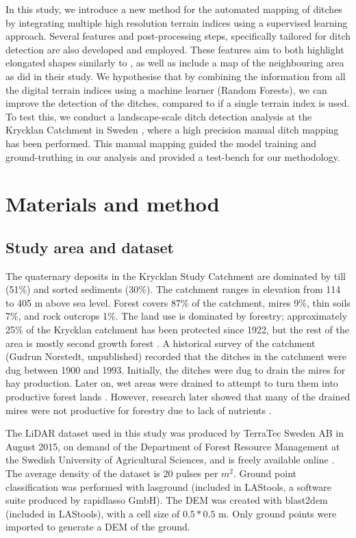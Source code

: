 \documentclass[11pt, review]{elsarticle} %
\begin{document}
In this study, we introduce a new method for the automated mapping of ditches by integrating multiple high resolution terrain indices using a supervised learning approach. Several features and post-processing steps, specifically tailored for ditch detection are also developed and employed. These features aim to both highlight elongated shapes similarly to \citet{cazorzi}, as well as include a map of the neighbouring area as \citet{roelens} did in their study. We hypothesise that by combining the information from all the digital terrain indices using a machine learner (Random Forests), we can improve the detection of the ditches, compared to if a single terrain index is used. To test this, we conduct a landscape-scale ditch detection analysis at the Krycklan Catchment in Sweden \citep{krycklancatchment}, where a high precision manual ditch mapping has been performed. This manual mapping guided the model training and ground-truthing in our analysis and provided a test-bench for our methodology.

\section{Materials and method}
\label{method}

\subsection{Study area and dataset}
The quaternary deposits in the Krycklan Study Catchment are dominated by till (51\%) and sorted sediments (30\%). The catchment ranges in elevation from 114 to 405 m above sea level. Forest covers 87\% of the catchment, mires 9\%, thin soils 7\%, and rock outcrops 1\%. The land use is dominated by forestry; approximately 25\% of the Krycklan catchment has been protected since 1922, but  the rest of the area is mostly second growth forest \citep{krycklancatchment}.  A historical survey of the catchment (Gudrun Norstedt, unpublished) recorded  that the ditches in the catchment were dug between 1900 and 1993. Initially, the ditches were dug to drain the mires for hay production. Later on, wet areas were drained to attempt to turn them into productive forest lands \citep{paivanen}. However, research later showed that many of the drained mires were not productive for forestry due to lack of nutrients \citep{sikstrom}.

The LiDAR dataset used in this study was produced by TerraTec Sweden AB in August 2015, on demand of the Department of Forest Resource Management at the Swedish University of Agricultural Sciences, and is freely available online \citep{dataset}. The average density of the dataset is 20 pulses per $m^2$. Ground point classification was performed with lasground (included in LAStools, a software suite produced by rapidlasso GmbH). The DEM was created with blast2dem (included in LAStools), with a cell size of $0.5*0.5$ m. Only ground points were imported to generate a DEM of the ground.
\end{document}
